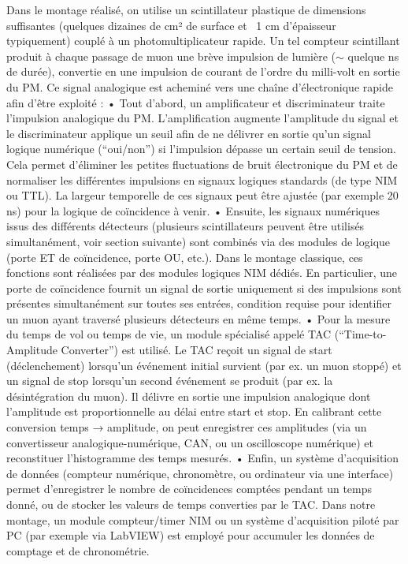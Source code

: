 \documentclass[a4paper,12pt,twoside]{article}
\begin{document}
Dans le montage réalisé, on utilise un scintillateur plastique de dimensions suffisantes (quelques dizaines de cm² de surface et ~1 cm d’épaisseur typiquement) couplé à un photomultiplicateur rapide. Un tel compteur scintillant produit à chaque passage de muon une brève impulsion de lumière ($\sim$ quelque ns de durée), convertie en une impulsion de courant de l’ordre du milli-volt en sortie du PM. Ce signal analogique est acheminé vers une chaîne d’électronique rapide afin d’être exploité :
	•	Tout d’abord, un amplificateur et discriminateur traite l’impulsion analogique du PM. L’amplification augmente l’amplitude du signal et le discriminateur applique un seuil afin de ne délivrer en sortie qu’un signal logique numérique (“oui/non”) si l’impulsion dépasse un certain seuil de tension. Cela permet d’éliminer les petites fluctuations de bruit électronique du PM et de normaliser les différentes impulsions en signaux logiques standards (de type NIM ou TTL). La largeur temporelle de ces signaux peut être ajustée (par exemple 20 ns) pour la logique de coïncidence à venir.
	•	Ensuite, les signaux numériques issus des différents détecteurs (plusieurs scintillateurs peuvent être utilisés simultanément, voir section suivante) sont combinés via des modules de logique (porte ET de coïncidence, porte OU, etc.). Dans le montage classique, ces fonctions sont réalisées par des modules logiques NIM dédiés. En particulier, une porte de coïncidence fournit un signal de sortie uniquement si des impulsions sont présentes simultanément sur toutes ses entrées, condition requise pour identifier un muon ayant traversé plusieurs détecteurs en même temps.
	•	Pour la mesure du temps de vol ou temps de vie, un module spécialisé appelé TAC (“Time-to-Amplitude Converter”) est utilisé. Le TAC reçoit un signal de start (déclenchement) lorsqu’un événement initial survient (par ex. un muon stoppé) et un signal de stop lorsqu’un second événement se produit (par ex. la désintégration du muon). Il délivre en sortie une impulsion analogique dont l’amplitude est proportionnelle au délai entre start et stop. En calibrant cette conversion temps → amplitude, on peut enregistrer ces amplitudes (via un convertisseur analogique-numérique, CAN, ou un oscilloscope numérique) et reconstituer l’histogramme des temps mesurés.
	•	Enfin, un système d’acquisition de données (compteur numérique, chronomètre, ou ordinateur via une interface) permet d’enregistrer le nombre de coïncidences comptées pendant un temps donné, ou de stocker les valeurs de temps converties par le TAC. Dans notre montage, un module compteur/timer NIM ou un système d’acquisition piloté par PC (par exemple via LabVIEW) est employé pour accumuler les données de comptage et de chronométrie.
\end{document}
